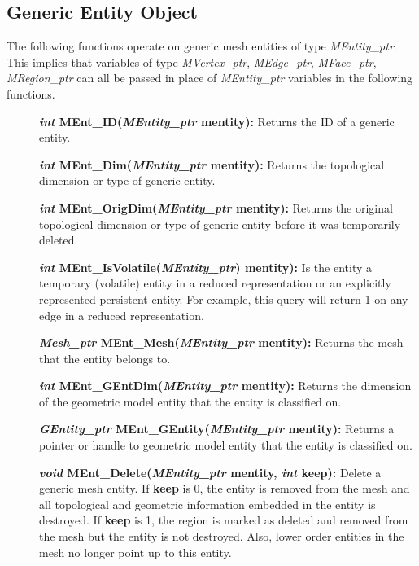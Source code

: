 \documentclass[12pt]{article}
\begin{document}
\newpage
\subsection{Generic Entity Object}

The following functions operate on generic mesh entities of type
{\em MEntity\_ptr}. This implies that variables of type
{\em MVertex\_ptr}, {\em MEdge\_ptr}, {\em MFace\_ptr},
{\em MRegion\_ptr} can all be passed in place of
{\em MEntity\_ptr} variables in the following functions.

\begin{description}

  
\item[]{\bf {\em int} MEnt\_ID({\em MEntity\_ptr} mentity):} Returns
the ID of a generic entity.

\item[]{\bf {\em int} MEnt\_Dim({\em MEntity\_ptr} mentity):}
Returns the topological dimension or type of generic entity.

\item[]{\bf {\em int} MEnt\_OrigDim({\em MEntity\_ptr} mentity):}
Returns the original topological dimension or type of generic entity before it
was temporarily deleted.

\item[]{\bf {\em int} MEnt\_IsVolatile({\em MEntity\_ptr}) mentity):}
  Is the entity a temporary (volatile) entity in a reduced
  representation or an explicitly represented persistent entity. For
  example, this query will return 1 on any edge in a reduced
  representation.

\item[]{\bf {\em Mesh\_ptr} MEnt\_Mesh({\em MEntity\_ptr} mentity):}
Returns the mesh that the entity belongs to.

\item[]{\bf {\em int} MEnt\_GEntDim({\em MEntity\_ptr}
    mentity):} Returns the dimension of the geometric model entity
  that the entity is classified on.
  
\item[]{\bf {\em GEntity\_ptr}
    MEnt\_GEntity({\em MEntity\_ptr} mentity):} Returns a pointer
  or handle to geometric model entity that the entity is classified
  on.

\item[]{\bf {\em void} MEnt\_Delete({\em MEntity\_ptr} mentity, {\em
      int} keep):} Delete a generic mesh entity. If {\bf keep} is 0,
  the entity is removed from the mesh and all topological and
  geometric information embedded in the entity is destroyed. If {\bf
    keep} is 1, the region is marked as deleted and removed from the
  mesh but the entity is not destroyed. Also, lower order entities in
  the mesh no longer point up to this entity.


\end{description}
\end{document}
